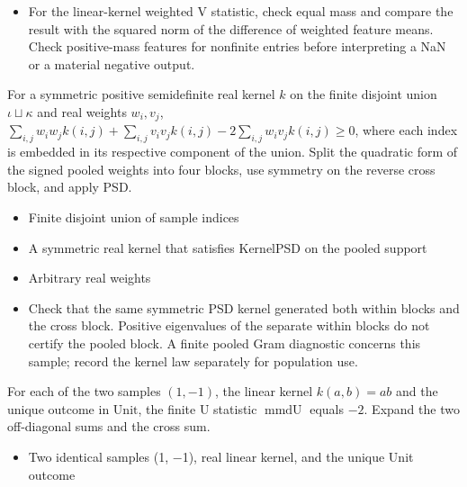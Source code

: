 \expandafter\def\csname statadic@diagnostics@STATADIC-MMD-003\endcsname{\begin{itemize}
\item For the linear-kernel weighted V statistic, check equal mass and compare the result with the squared norm of the difference of weighted feature means. Check positive-mass features for nonfinite entries before interpreting a NaN or a material negative output.
\end{itemize}}
\expandafter\def\csname statadic@statement@STATADIC-MMD-004\endcsname{For a symmetric positive semidefinite real kernel $k$ on
  the finite disjoint union $\iota\sqcup\kappa$ and real weights $w_i,v_j$,
  $\sum_{i,j}w_iw_jk(i,j)+\sum_{i,j}v_iv_jk(i,j)-2\sum_{i,j}w_iv_jk(i,j)\geq0$,
  where each index is embedded in its respective component of the union.}
\expandafter\def\csname statadic@proof@STATADIC-MMD-004\endcsname{Split the quadratic form of the signed pooled weights into four
  blocks, use symmetry on the reverse cross block, and apply PSD.}
\expandafter\def\csname statadic@assumptions@STATADIC-MMD-004\endcsname{\begin{itemize}
\item Finite disjoint union of sample indices
\item A symmetric real kernel that satisfies KernelPSD on the pooled support
\item Arbitrary real weights
\end{itemize}}
\expandafter\def\csname statadic@diagnostics@STATADIC-MMD-004\endcsname{\begin{itemize}
\item Check that the same symmetric PSD kernel generated both within blocks and the cross block. Positive eigenvalues of the separate within blocks do not certify the pooled block. A finite pooled Gram diagnostic concerns this sample; record the kernel law separately for population use.
\end{itemize}}
\expandafter\def\csname statadic@statement@STATADIC-MMD-005\endcsname{For each of the two samples $(1,-1)$, the linear kernel
  $k(a,b)=ab$ and the unique outcome in $\mathrm{Unit}$, the finite U statistic
  $\operatorname{mmdU}$ equals $-2$.}
\expandafter\def\csname statadic@proof@STATADIC-MMD-005\endcsname{Expand the two off-diagonal sums and the cross sum.}
\expandafter\def\csname statadic@assumptions@STATADIC-MMD-005\endcsname{\begin{itemize}
\item Two identical samples (1, \ensuremath{-}1), real linear kernel, and the unique Unit outcome
\end{itemize}}
